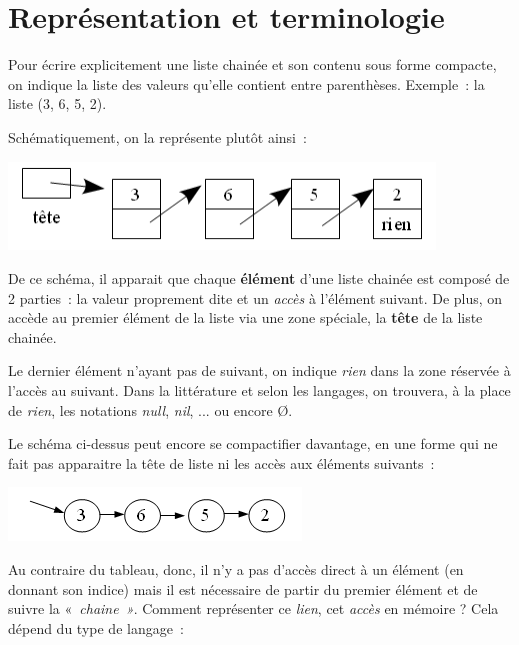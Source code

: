 \section{Représentation et terminologie}

	Pour écrire explicitement une liste chainée et son contenu 
	sous forme compacte, on indique la liste des valeurs qu'elle
	contient entre parenthèses. Exemple~: la liste (3, 6, 5, 2).
	
	Schématiquement, on la représente plutôt ainsi~:

	\begin{center}
	\includegraphics[width=11.324cm,height=2.355cm]{image/a2012Logique2eme-img002.png}
	\end{center}
	
	De ce schéma, il apparait que chaque \textbf{élément} 
	d'une liste chainée est composé de 2 parties~: la valeur
	proprement dite et un \textit{accès} à l'élément suivant. 
	De plus, on accède au premier élément de la liste via une
	zone spéciale, la \textbf{tête} de la liste chainée.

	Le dernier élément n'ayant pas de suivant, on indique \textit{rien} 
	dans la zone réservée à l'accès au suivant. Dans la
	littérature et selon les langages, on trouvera, à la place de \textit{rien}, 
	les notations \textit{null}, \textit{nil}, ... ou encore Ø.
	
	Le schéma ci-dessus peut encore se compactifier davantage, 
	en une forme qui ne fait pas apparaitre la tête de liste ni
	les accès aux éléments suivants~:

	\begin{center}
	\includegraphics[width=7.779cm,height=1.429cm]{image/a2012Logique2eme-img003.png}
	\end{center}
	
	Au contraire du tableau, donc, il n'y a pas d'accès direct à un élément 
	(en donnant son indice) mais il est nécessaire
	de partir du premier élément et de suivre la «~\textit{chaine~»}. 
	Comment représenter ce \textit{lien}, cet
	\textit{accès} en mémoire ? Cela dépend du type de langage~:

